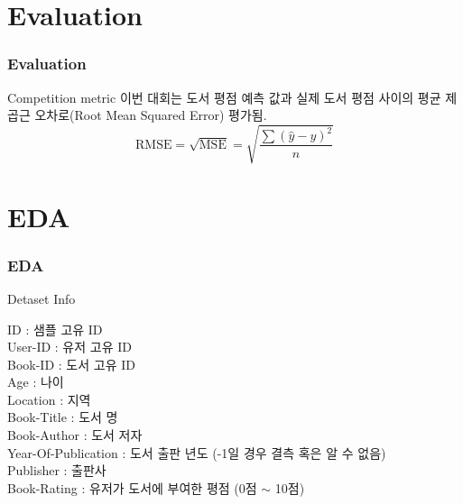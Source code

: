 \documentclass{beamer}
\newcommand\Fontvi{\fontsize{9}{8}\selectfont}
\begin{document}
\section{Evaluation}

\begin{frame}
\frametitle{Evaluation}

\begin{block}{Competition metric}
이번 대회는 도서 평점 예측 값과 실제 도서 평점 사이의 평균 제곱근 오차로(Root Mean Squared Error) 평가됨.\\
$$\text{RMSE} = \sqrt{\text{MSE}} = \sqrt{\frac{\sum(\hat{y}-y)^{2}}{n}}$$

\end{block}

\end{frame}



\section{EDA}

\begin{frame}
\frametitle{EDA}

\begin{block}{Detaset Info}

\Fontvi
ID : 샘플 고유 ID\\
User-ID : 유저 고유 ID\\
Book-ID : 도서 고유 ID\\
Age : 나이\\
Location : 지역\\
Book-Title : 도서 명\\
Book-Author : 도서 저자\\
Year-Of-Publication : 도서 출판 년도 (-1일 경우 결측 혹은 알 수 없음)\\
Publisher : 출판사\\
Book-Rating : 유저가 도서에 부여한 평점 (0점 $\sim$ 10점)

\end{block}

\end{frame}
\end{document}
